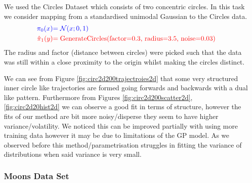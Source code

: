 \documentclass[a4paper,12pt,twoside,openright]{report}
\theoremstyle{definition}
\begin{document}
We  used the Circles Dataset \citep{pedregosa2011scikit} which consists of two concentric circles. In this task we consider mapping from a standardised unimodal Gaussian to the Circles data.
\begin{align*}
     \color{blue}{\pi_0(x)} &\color{blue}{= {\mathcal{N}}(x; 0,  1)} \\
    \color{red}{\hat{\pi}_1(y)} &\color{red}{= \text{GenerateCircles(factor=0.3, radius=3.5, noise=0.03)}}
\end{align*}
The radius and factor (distance between circles) were picked such that the data was still within a close proximity to the origin whilst making the circles distinct.

We can see from Figure \ref{fig:circ2d200trajectroies2d} that some very structured inner circle like trajectories are formed going forwards and backwards with a dual like pattern. Furthermore from Figures \ref{fig:circ2d200scatter2d}, \ref{fig:circ2d20hist2d} we can observe a good fit in terms of structure, however the fits of our method are  bit more noisy/disperse they seem to have higher variance/volatility. We noticed this can be improved partially with using more training data however it may be due to limitations of the GP model. As we observed before this method/parametrisation struggles in fitting the variance of distributions when said variance is very small.


\subsubsection{Moons Data Set}
\end{document}
